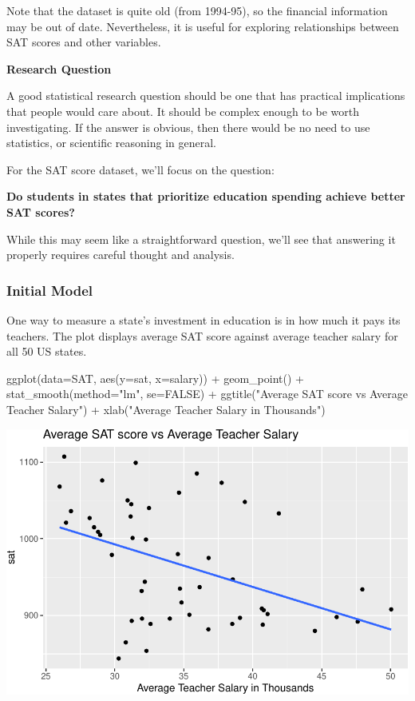 \documentclass[
  letterpaper,
  DIV=11,
  numbers=noendperiod]{scrreprt}
\newenvironment{Shaded}{\begin{snugshade}}{\end{snugshade}}
\newcommand{\AttributeTok}[1]{\textcolor[rgb]{0.40,0.45,0.13}{#1}}
\newcommand{\ConstantTok}[1]{\textcolor[rgb]{0.56,0.35,0.01}{#1}}
\newcommand{\FunctionTok}[1]{\textcolor[rgb]{0.28,0.35,0.67}{#1}}
\newcommand{\NormalTok}[1]{\textcolor[rgb]{0.00,0.23,0.31}{#1}}
\newcommand{\SpecialCharTok}[1]{\textcolor[rgb]{0.37,0.37,0.37}{#1}}
\newcommand{\StringTok}[1]{\textcolor[rgb]{0.13,0.47,0.30}{#1}}
\begin{document}
Note that the dataset is quite old (from 1994-95), so the financial
information may be out of date. Nevertheless, it is useful for exploring
relationships between SAT scores and other variables.

\textbf{Research Question}

A good statistical research question should be one that has practical
implications that people would care about. It should be complex enough
to be worth investigating. If the answer is obvious, then there would be
no need to use statistics, or scientific reasoning in general.

For the SAT score dataset, we'll focus on the question:

\textbf{Do students in states that prioritize education spending achieve
better SAT scores?}

While this may seem like a straightforward question, we'll see that
answering it properly requires careful thought and analysis.

\subsubsection{Initial Model}\label{initial-model}

One way to measure a state's investment in education is in how much it
pays its teachers. The plot displays average SAT score against average
teacher salary for all 50 US states.

\begin{Shaded}
\begin{Highlighting}[]
\FunctionTok{ggplot}\NormalTok{(}\AttributeTok{data=}\NormalTok{SAT, }\FunctionTok{aes}\NormalTok{(}\AttributeTok{y=}\NormalTok{sat, }\AttributeTok{x=}\NormalTok{salary)) }\SpecialCharTok{+} \FunctionTok{geom\_point}\NormalTok{() }\SpecialCharTok{+}
  \FunctionTok{stat\_smooth}\NormalTok{(}\AttributeTok{method=}\StringTok{"lm"}\NormalTok{, }\AttributeTok{se=}\ConstantTok{FALSE}\NormalTok{) }\SpecialCharTok{+} 
  \FunctionTok{ggtitle}\NormalTok{(}\StringTok{"Average SAT score vs Average Teacher Salary"}\NormalTok{) }\SpecialCharTok{+} 
  \FunctionTok{xlab}\NormalTok{(}\StringTok{"Average Teacher Salary in Thousands"}\NormalTok{) }
\end{Highlighting}
\end{Shaded}

\includegraphics{Ch5_files/figure-pdf/unnamed-chunk-32-1.pdf}
\end{document}

